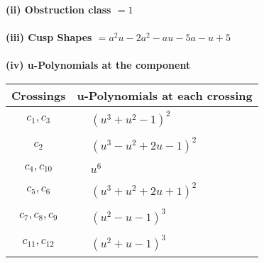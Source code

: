 \documentclass[1p]{elsarticle_modified}
\theoremstyle{definition}
\begin{document}
\flushleft \textbf{(ii) Obstruction class $= 1$}\\~\\
\flushleft \textbf{(iii) Cusp Shapes $= a^2 u-2 a^2- a u-5 a- u+5$}\\~\\
\newpage\renewcommand{\arraystretch}{1}
\flushleft \textbf{(iv) u-Polynomials at the component}\newline \\
\begin{tabular}{m{50pt}|m{274pt}}
Crossings & \hspace{64pt}u-Polynomials at each crossing \\
\hline $$\begin{aligned}c_{1},c_{3}\end{aligned}$$&$\begin{aligned}
&(u^3+u^2-1)^2
\end{aligned}$\\
\hline $$\begin{aligned}c_{2}\end{aligned}$$&$\begin{aligned}
&(u^3- u^2+2 u-1)^2
\end{aligned}$\\
\hline $$\begin{aligned}c_{4},c_{10}\end{aligned}$$&$\begin{aligned}
&u^6
\end{aligned}$\\
\hline $$\begin{aligned}c_{5},c_{6}\end{aligned}$$&$\begin{aligned}
&(u^3+u^2+2 u+1)^2
\end{aligned}$\\
\hline $$\begin{aligned}c_{7},c_{8},c_{9}\end{aligned}$$&$\begin{aligned}
&(u^2- u-1)^3
\end{aligned}$\\
\hline $$\begin{aligned}c_{11},c_{12}\end{aligned}$$&$\begin{aligned}
&(u^2+u-1)^3
\end{aligned}$\\
\hline
\end{tabular}\\~\\
\end{document}
